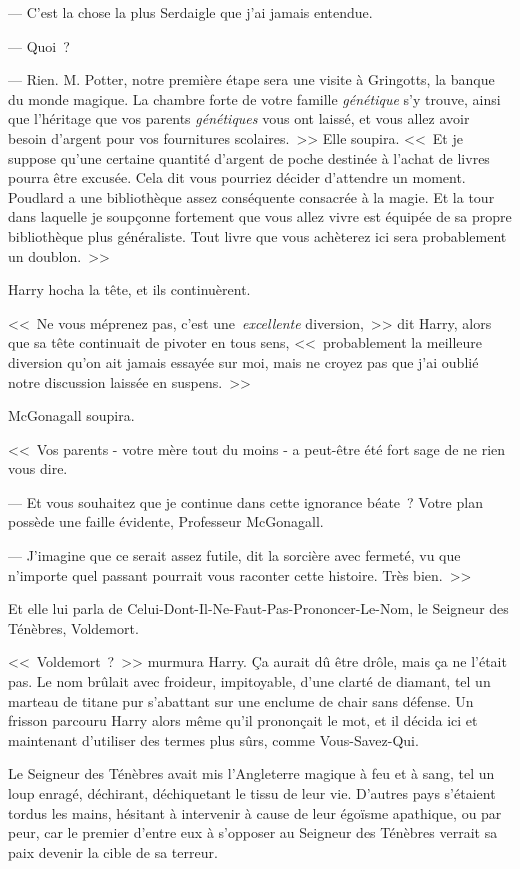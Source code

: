 --- C'est la chose la plus Serdaigle que j'ai jamais entendue.

--- Quoi~?

--- Rien. M. Potter, notre première étape sera une visite à Gringotts, la banque du monde magique. La chambre forte de votre famille \emph{génétique} s'y trouve, ainsi que l'héritage que vos parents \emph{génétiques} vous ont laissé, et vous allez avoir besoin d'argent pour vos fournitures scolaires.~>> Elle soupira. <<~Et je suppose qu'une certaine quantité d'argent de poche destinée à l'achat de livres pourra être excusée. Cela dit vous pourriez décider d'attendre un moment. Poudlard a une bibliothèque assez conséquente consacrée à la magie. Et la tour dans laquelle je soupçonne fortement que vous allez vivre est équipée de sa propre bibliothèque plus généraliste. Tout livre que vous achèterez ici sera probablement un doublon.~>>

Harry hocha la tête, et ils continuèrent.

<<~Ne vous méprenez pas, c'est une~\emph{excellente} diversion,~>> dit Harry, alors que sa tête continuait de pivoter en tous sens, <<~probablement la meilleure diversion qu'on ait jamais essayée sur moi, mais ne croyez pas que j'ai oublié notre discussion laissée en suspens.~>>

McGonagall soupira.

<<~Vos parents - votre mère tout du moins - a peut-être été fort sage de ne rien vous dire.

--- Et vous souhaitez que je continue dans cette ignorance béate~? Votre plan possède une faille évidente, Professeur McGonagall.

--- J'imagine que ce serait assez futile, dit la sorcière avec fermeté, vu que n'importe quel passant pourrait vous raconter cette histoire. Très bien.~>>

Et elle lui parla de Celui-Dont-Il-Ne-Faut-Pas-Prononcer-Le-Nom, le Seigneur des Ténèbres, Voldemort.

<<~Voldemort~?~>> murmura Harry. Ça aurait dû être drôle, mais ça ne l'était pas. Le nom brûlait avec froideur, impitoyable, d'une clarté de diamant, tel un marteau de titane pur s'abattant sur une enclume de chair sans défense. Un frisson parcouru Harry alors même qu'il prononçait le mot, et il décida ici et maintenant d'utiliser des termes plus sûrs, comme Vous-Savez-Qui.

Le Seigneur des Ténèbres avait mis l'Angleterre magique à feu et à sang, tel un loup enragé, déchirant, déchiquetant le tissu de leur vie. D'autres pays s'étaient tordus les mains, hésitant à intervenir à cause de leur égoïsme apathique, ou par peur, car le premier d'entre eux à s'opposer au Seigneur des Ténèbres verrait sa paix devenir la cible de sa terreur.

